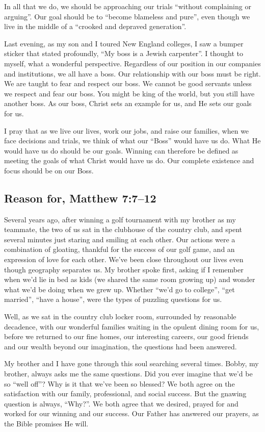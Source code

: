 \documentclass[12pt]{memoir}
\begin{document}
In all that we do, we should be approaching our trials ``without
complaining or arguing''. Our goal should be to ``become blameless
and pure'', even though we live in the middle of a ``crooked and
depraved generation''. 

Last evening, as my son and I toured New England colleges, I saw a
bumper sticker that stated profoundly, ``My boss is a Jewish carpenter''.
I thought to myself, what a wonderful perspective. Regardless of our
position in our companies and institutions, we all have a boss. Our
relationship with our boss must be right. We are taught to fear and
respect our boss. We cannot be good servants unless we respect and
fear our boss. You might be king of the world, but you still have
another boss. As our boss, Christ sets an example for us, and He sets
our goals for us. 

I pray that as we live our lives, work our jobs, and raise our families,
when we face decisions and trials, we think of what our ``Boss''
would have us do. What He would have us do should be our goals. Winning
can therefore be defined as meeting the goals of what Christ would
have us do. Our complete existence and focus should be on our Boss. 

\subsection{Reason for, Matthew 7:7--12}

Several years ago, after winning a golf tournament with my brother
as my teammate, the two of us sat in the clubhouse of the country
club, and spent several minutes just staring and smiling at each other.
Our actions were a combination of gloating, thankful for the success
of our golf game, and an expression of love for each other. We've
been close throughout our lives even though geography separates us.
My brother spoke first, asking if I remember when we'd lie in bed
as kids (we shared the same room growing up) and wonder what we'd
be doing when we grew up. Whether ``we'd go to college'', ``get
married'', ``have a house'', were the types of puzzling questions
for us.

Well, as we sat in the country club locker room, surrounded by reasonable
decadence, with our wonderful families waiting in the opulent dining
room for us, before we returned to our fine homes, our interesting
careers, our good friends and our wealth beyond our imagination, the
questions had been answered.

My brother and I have gone through this soul searching several times.
Bobby, my brother, always asks me the same questions. Did you ever
imagine that we'd be so ``well off''? Why is it that we've been
so blessed? We both agree on the satisfaction with our family, professional,
and social success. But the gnawing question is always, ``Why?''.
We both agree that we desired, prayed for and worked for our winning
and our success. Our Father has answered our prayers, as the Bible
promises He will. 
\end{document}
